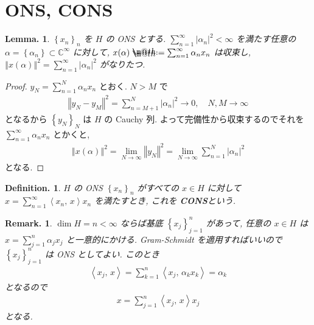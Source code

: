 \documentclass[openany, a4paper, oneside]{jsbook}
\makeatletter
\newcommand*{\defeq}{\mathrel{\rlap{%
\raisebox{0.3ex}{$\m@th\cdot$}}%
\raisebox{-0.3ex}{$\m@th\cdot$}}%
=}
\theoremstyle{break}
\theoremstyle{breakdefn}
\newtheorem{lem}[thm]{Lemma.}
\newtheorem{defn}[thm]{Definition.}
\newtheorem{rem}[thm]{Remark.}
\newcommand{\abs}[1]{\left|#1\right|}
\newcommand{\norm}[1]{\left\Vert#1\right\Vert}
\newcommand{\rbk}[1]{\left (#1\right)}
\newcommand{\cbk}[1]{\left\{#1\right\}}
\newcommand{\bkt}[2]{\left\langle#1,\,#2\right\rangle}
\newcommand{\bbC}{\mathbb{C}}
\newcommand{\upbf}[1]{\textup{\textbf{#1}}}
\makeatother
\begin{document}
\section{ONS, CONS}


\begin{lem}\label{functional_analysis_hilbert_space_yukimi_7}
 $\cbk{x_{n}}_{n}$ を $H$ の ONS とする.
 $\sum_{n = 1}^\infty \abs{\alpha_{n}}^2 < \infty$ を満たす任意の
 $\alpha = \cbk{\alpha_{n}} \subset \bbC^{\infty}$ に対して,
 $x (\alpha) \defeq \sum_{n = 1}^\infty \alpha_{n}x_{n}$ は収束し,
 $\norm{x \rbk{\alpha}}^2 = \sum_{n=1}^\infty \abs{\alpha_{n}}^2$ がなりたつ.
\end{lem}
\begin{proof}
$y_{N} = \sum_{n=1}^N \alpha_{n} x_{n}$ とおく.
$N > M$ で
\begin{align}
 \norm{y_N - y_M}^2
 =
 \sum_{n = M+1}^N \abs{\alpha_n}^2
 \to 0, \quad N, M \to \infty
\end{align}
となるから $\cbk{y_N}_N$ は $H$ の Cauchy 列.
よって完備性から収束するのでそれを $\sum_{n=1}^\infty \alpha_n x_n$ とかくと,
\begin{align}
 \norm{x \rbk{\alpha}}^2
 =
 \lim_{N \to \infty} \norm{y_N}^2
 =
 \lim_{N \to \infty} \sum_{n=1}^N \abs{\alpha_{n}}^2
\end{align}
となる.
\end{proof}

\begin{defn}
 $H$ の ONS $\cbk{x_{n}}_n$ がすべての $x \in H$ に対して $x = \sum_{n = 1}^\infty \bkt{{x_n}}{x} x_n$ を満たすとき,
 これを \upbf{CONS}という.
\end{defn}
\begin{rem}
 $\dim H = n < \infty$ ならば基底 $\cbk{x_{j}}_{j=1}^n$ があって,
 任意の $x \in H$ は $x = \sum_{j = 1}^n \alpha_j x_j$ と一意的にかける.
 Gram-Schmidt を適用すればいいので $\cbk{x_{j}}_{j=1}^n$ は ONS としてよい.
 このとき
 \begin{align}
  \bkt{x_j}{x}
  =
  \sum_{k=1}^n \bkt{x_j}{\alpha_k x_k}
  =
  \alpha_k
 \end{align}
 となるので
 \begin{align}
  x
  =
  \sum_{j = 1}^n \bkt{x_j}{x} x_j
 \end{align}
 となる.
\end{rem}
\end{document}
